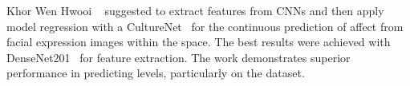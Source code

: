 Khor Wen Hwooi \etal~\cite{hwooi_deep_2022} suggested to extract features from CNNs and then apply model regression with a CultureNet~\cite{rudovic2018culturenet} for the continuous prediction of affect from facial expression images within the \va{} space. The best results were achieved with DenseNet201~\cite{huang2017densely} for feature extraction. The work demonstrates superior performance in predicting \va{} levels, particularly on the \affectnet{} dataset.
